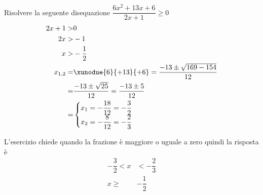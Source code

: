 	Risolvere la seguente disequazione $\dfrac{6x^2+13x+6}{2x+1}\geq0$
	\begin{align*}
	2x+1>&0\\
	2x>&-1\\
	x>&-\dfrac{1}{2}\\
	x_{1,2}=&\xunodue{6}{+13}{+6}=\dfrac{-13\pm\sqrt{169-154}}{12}\\
	=&\dfrac{-13\pm\sqrt{25}}{12}=\dfrac{-13\pm 5}{12}\\
	=&\begin{cases}
	x_1=-\dfrac{18}{12}=-\dfrac{3}{2}\\
	x_2=-\dfrac{8}{12}=-\dfrac{2}{3}
	\end{cases}\\
	\end{align*}
	\begin{center}
		
	\end{center}
L'esercizio chiede quando la frazione è maggiore o uguale a zero quindi la risposta è
\begin{align*}
-\dfrac{3}{2}<x&< -\dfrac{2}{3}\\ x\geq&-\dfrac{1}{2}\\
\end{align*}
